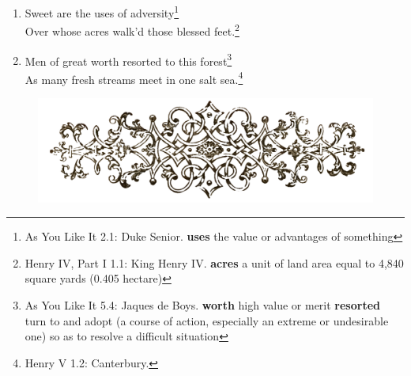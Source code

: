 \documentclass[17pt,twoside]{extarticle}
\begin{document}
\begin{enumerate}
{    wasted devoted to material pleasures}
\item
  Sweet are the uses of adversity\footnote{As You Like It 2.1: Duke
    Senior. \textbf{uses} the value or advantages of something}\\Over
  whose acres walk'd those blessed feet.\footnote{Henry IV, Part I 1.1:
    King Henry IV. \textbf{acres} a unit of land area equal to 4,840
    square yards (0.405 hectare)}
\item
  Men of great worth resorted to this forest\footnote{As You Like It
    5.4: Jaques de Boys. \textbf{worth} high value or merit
    \textbf{resorted} turn to and adopt (a course of action, especially
    an extreme or undesirable one) so as to resolve a difficult
    situation}\\As many fresh streams meet in one salt sea.\footnote{Henry
    V 1.2: Canterbury.}
\end{enumerate}

\vspace{1.4cm}

\begin{figure}[htbp]
\centering
\includegraphics[width=15.5cm]{images/frontispiece.png}
\end{figure}
\end{document}
